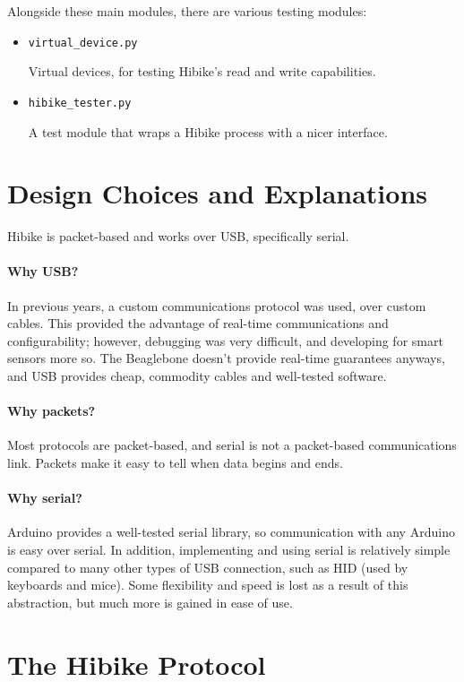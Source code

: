 \documentclass[12pt]{book}
\begin{document}
Alongside these main modules, there are various testing modules:
\begin{itemize}
	\item \texttt{virtual\_device.py}

	Virtual devices, for testing Hibike's read and write capabilities.
	\item \texttt{hibike\_tester.py}

	A test module that wraps a Hibike process with a nicer interface.
\end{itemize}

\section{Design Choices and Explanations}
Hibike is packet-based and works over USB, specifically serial.

\paragraph{Why USB?}

In previous years, a custom communications protocol was used, over custom cables.
This provided the advantage of real-time communications
and configurability; however, debugging was very difficult,
and developing for smart sensors more so. The Beaglebone doesn't provide real-time guarantees
anyways, and USB provides cheap, commodity cables and well-tested software.

\paragraph{Why packets?}

Most protocols are packet-based, and serial is not a packet-based communications link.
Packets make it easy to tell when data begins and ends.

\paragraph{Why serial?}

Arduino provides a well-tested serial library, so communication with any Arduino is easy
over serial. In addition, implementing and using serial is relatively simple compared
to many other types of USB connection, such as HID (used by keyboards and mice). Some
flexibility and speed is lost as a result of this abstraction, but much more is gained
in ease of use.

\section{The Hibike Protocol}
\end{document}
